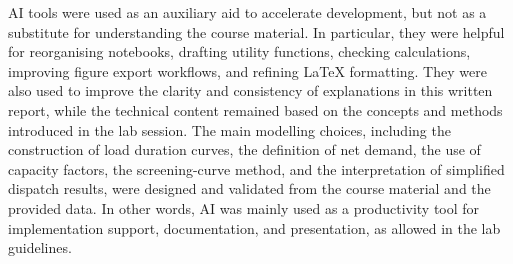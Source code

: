 \documentclass[a4paper]{report}
\begin{document}
{\small
\noindent AI tools were used as an auxiliary aid to accelerate development, but not as a substitute for understanding the course material. In particular, they were helpful for reorganising notebooks, drafting utility functions, checking calculations, improving figure export workflows, and refining \LaTeX{} formatting. They were also used to improve the clarity and consistency of explanations in this written report, while the technical content remained based on the concepts and methods introduced in the lab session. The main modelling choices, including the construction of load duration curves, the definition of net demand, the use of capacity factors, the screening-curve method, and the interpretation of simplified dispatch results, were designed and validated from the course material and the provided data. In other words, AI was mainly used as a productivity tool for implementation support, documentation, and presentation, as allowed in the lab guidelines.
}



%
%
\end{document}
